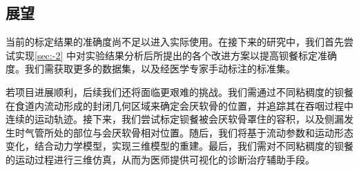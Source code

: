 \subsection{展望}

当前的标定结果的准确度尚不足以进入实际使用。在接下来的研究中，我们首先尝试实现\cref{sec:-2} 中对实验结果分析后所提出的各个改进方案以提高钡餐标定准确度。我们需获取更多的数据集，以及经医学专家手动标注的标准集。

若项目进展顺利，后续我们还将面临更艰难的挑战。我们需通过不同粘稠度的钡餐在食道内流动形成的封闭几何区域来确定会厌软骨的位置，并追踪其在吞咽过程中连续的运动轨迹。接下来，我们尝试标定钡餐被会厌软骨罩住的容积，以及侧漏发生时气管所处的部位与会厌软骨相对位置。随后，我们将基于流动参数和运动形态变化，结合动力学模型，实现三维模型的重建。最后，我们需对不同粘稠度的钡餐的运动过程进行三维仿真，从而为医师提供可视化的诊断治疗辅助手段。